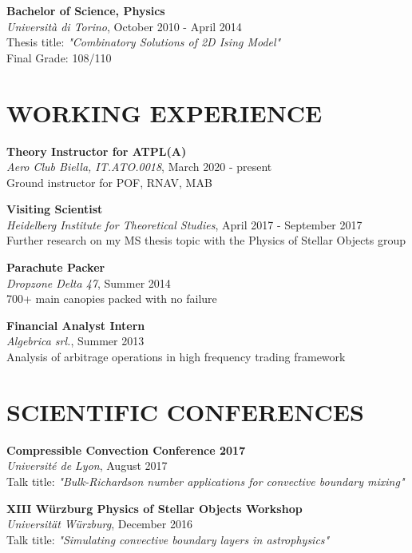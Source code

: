 \documentclass[margin]{res}
\begin{document}
\begin{resume}
\textbf{Bachelor of Science, Physics} \\
{\sl Università di Torino}, October 2010 - April 2014\\
Thesis title: \textit{"Combinatory Solutions of 2D Ising Model"}\\
\hfill Final Grade: 108/110

\section{WORKING EXPERIENCE}

\textbf{Theory Instructor for ATPL(A)}\\
{\sl Aero Club Biella, IT.ATO.0018}, March 2020 - present\\
Ground instructor for POF, RNAV, MAB

\textbf{Visiting Scientist}\\
{\sl Heidelberg Institute for Theoretical Studies}, April 2017 - September 2017\\
Further research on my MS thesis topic with the Physics of Stellar Objects group

\textbf{Parachute Packer}\\
{\sl Dropzone Delta 47}, Summer 2014\\
700+ main canopies packed with no failure

\textbf{Financial Analyst Intern}\\
{\sl Algebrica srl.}, Summer 2013\\
Analysis of arbitrage operations in high frequency trading framework  

\section{SCIENTIFIC CONFERENCES}

\textbf{Compressible Convection Conference 2017}\\
{\sl Université de Lyon}, August 2017\\
Talk title: \textit{"Bulk-Richardson number applications for convective boundary mixing"}  

\bigskip

\pagebreak
\textbf{XIII Würzburg Physics of Stellar Objects Workshop }\\
{\sl Universität Würzburg}, December 2016\\
Talk title: \textit{"Simulating convective boundary layers in astrophysics"}  


\end{resume}
\end{document}
